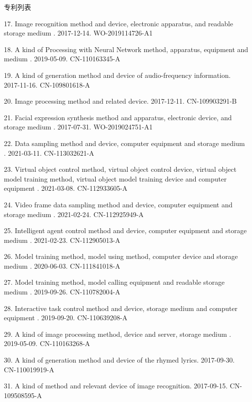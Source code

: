 \documentclass[UTF8]{cv_professional-cn} %
\makeatletter
\newlength{\bibhang}
\newlength{\bibsep}
 {\@listi \global\bibsep\itemsep \global\advance\bibsep by\parsep}
\newenvironment{bibsection}%
        {\vspace{\itemsep}\begin{list}{}{%
       \setlength{\leftmargin}{\bibhang}%
       \setlength{\itemsep}{\bibsep}%
       \setlength{\parsep}{\z@}%
        \setlength{\partopsep}{0pt}%
        \setlength{\topsep}{0pt}}}
        {\end{list}\vspace{\itemsep}}
\makeatother
\begin{document}
\begin{rSection}{专利列表}
\begin{bibsection}
        \item[17.] Image recognition method and device, electronic apparatus, and readable storage medium . 2017-12-14. WO-2019114726-A1
        \item[18.] A kind of Processing with Neural Network method, apparatus, equipment and medium . 2019-05-09. CN-110163345-A
        \item[19.] A kind of generation method and device of audio-frequency information. 2017-11-16. CN-109801618-A
        \item[20.] Image processing method and related device. 2017-12-11. CN-109903291-B
        \item[21.] Facial expression synthesis method and apparatus, electronic device, and storage medium . 2017-07-31. WO-2019024751-A1
        \item[22.] Data sampling method and device, computer equipment and storage medium . 2021-03-11. CN-113032621-A
        \item[23.] Virtual object control method, virtual object control device, virtual object model training method, virtual object model training device and computer equipment . 2021-03-08. CN-112933605-A
        \item[24.] Video frame data sampling method and device, computer equipment and storage medium . 2021-02-24. CN-112925949-A
        \item[25.] Intelligent agent control method and device, computer equipment and storage medium . 2021-02-23. CN-112905013-A
        \item[26.] Model training method, model using method, computer device and storage medium . 2020-06-03. CN-111841018-A
        \item[27.] Model training method, model calling equipment and readable storage medium . 2019-09-26. CN-110782004-A
        \item[28.] Interactive task control method and device, storage medium and computer equipment . 2019-09-20. CN-110639208-A
        \item[29.] A kind of image processing method, device and server, storage medium . 2019-05-09. CN-110163268-A
        \item[30.] A kind of generation method and device of the rhymed lyrics. 2017-09-30. CN-110019919-A
        \item[31.] A kind of method and relevant device of image recognition. 2017-09-15. CN-109508595-A
\end{bibsection}

\end{rSection}
\end{document}
